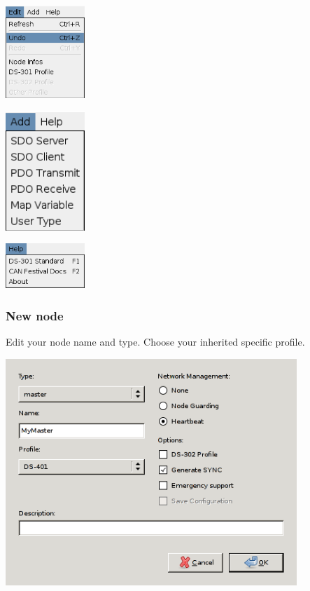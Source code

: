 \documentclass[12pt,english,a4paper]{book}
\begin{document}
\begin{center}
\includegraphics[width=3cm]{Pictures/10000000000000AC000000C9C3F53FA6} 
\par\end{center}

\begin{center}
\includegraphics[width=3cm]{Pictures/100000000000006D000000A31EC8CB54} 
\par\end{center}

\begin{center}
\includegraphics[width=3cm]{Pictures/10000000000000AA0000006014F74635} 
\par\end{center}


\subsubsection{New node}

Edit your node name and type. Choose your inherited specific profile.

\begin{center}
\includegraphics[width=11cm]{Pictures/new_node} 
\par\end{center}
\end{document}
